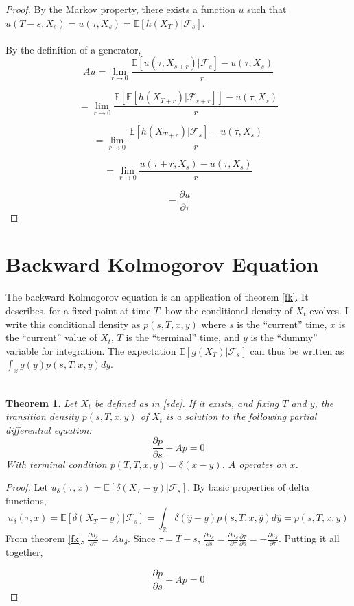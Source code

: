 \documentclass{article}
\newtheorem{theorem}{Theorem}
\theoremstyle{definition}
\begin{document}
\begin{proof}
	By the Markov property, there exists a function \(u\) such that \(u(T-s, X_s)=u(\tau, X_s)=\mathbb{E}[h(X_T)|\mathcal{F}_s]\). 
	\\
	\\
	By the definition of a generator,
	\[Au=\lim_{r \to 0} \frac{\mathbb{E}\left[ u(\tau, X_{s+r}) | \mathcal{F}_s \right] - u(\tau, X_s)}{r} \]
	
	\[ =  \lim_{r \to 0} \frac{\mathbb{E}\left[ \mathbb{E}\left[ h(X_{T+r}) | \mathcal{F}_{s+r} \right] \right] - u(\tau, X_s)}{r} \]
	
	\[ =  \lim_{r \to 0} \frac{ \mathbb{E}\left[ h(X_{T+r}) | \mathcal{F}_s \right] - u(\tau, X_s)}{r} \]
	
	\[ =  \lim_{r \to 0} \frac{ u(\tau+r, X_s) - u(\tau, X_s)}{r} \]
	
	\[= \frac{\partial u}{\partial \tau}\]
	

\end{proof}


\section{Backward Kolmogorov Equation}

The backward Kolmogorov equation is an application of theorem \ref{fk}.  It describes, for a fixed point at time \(T\), how the conditional density of \(X_t\) evolves.  I write this conditional density as \(p(s, T, x, y)\) where \(s\) is the ``current'' time, \(x\) is the ``current'' value of \(X_t\), \(T\) is the ``terminal'' time, and \(y\) is the ``dummy'' variable for integration.  The expectation \(\mathbb{E}[g(X_T)|\mathcal{F}_s]\) can thus be written as \(\int_\mathbb{R} g(y) p(s, T, x, y) dy \).   
\\
\\
\begin{theorem}\label{bk}
	Let \(X_t\) be defined as in \ref{sde}. If it exists, and fixing \(T\) and \(y\), the transition density \(p(s, T, x, y)\) of \(X_t\) is a solution to the following partial differential equation:
	\[\frac{\partial p}{\partial s} + Ap=0 \]
	With terminal condition \(p(T, T, x, y)=\delta(x-y)\).  \(A\) operates on \(x\).
\end{theorem}

\begin{proof}
	Let \(u_\delta (\tau, x)= \mathbb{E}\left[\delta(X_T-y)  | \mathcal{F}_s\right]\).
	By basic properties of delta functions, 
	\[u_\delta(\tau, x)=\mathbb{E}\left[\delta(X_T-y) | \mathcal{F}_s \right]=\int_\mathbb{R} \delta(\hat{y}-y) p(s, T, x, \hat{y}) d\hat{y}=p(s, T, x, y)\]
	From theorem \ref{fk}, \(\frac{\partial u_\delta}{\partial \tau}=Au_\delta\).  Since \(\tau=T-s\), \(\frac{\partial u_\delta}{\partial s} = \frac{\partial u_\delta}{\partial \tau} \frac{\partial \tau}{\partial s}=-\frac{\partial u_\delta}{\partial \tau} \).  Putting it all together, 
	
	\[\frac{\partial p}{\partial s} + Ap=0 \]
	
\end{proof}
\end{document}
